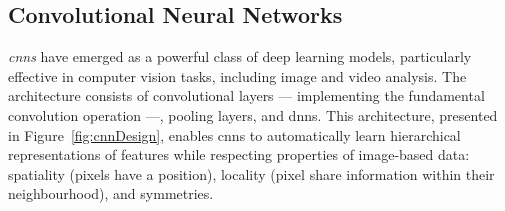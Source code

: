 \subsection{Convolutional Neural Networks}
\textit{\glspl{cnn}} \cite{NIPS198953c3bce6, NIPS2012_c399862d} have emerged as a powerful class of deep learning models, particularly effective in computer vision tasks, including image and video analysis. The architecture consists of convolutional layers — implementing the fundamental convolution operation —, pooling layers, and \glspl{dnn}. This architecture, presented in Figure~\ref{fig:cnnDesign}, enables \glspl{cnn} to automatically learn hierarchical representations of features while respecting properties of image-based data: spatiality (pixels have a position), locality (pixel share information within their neighbourhood), and symmetries.

